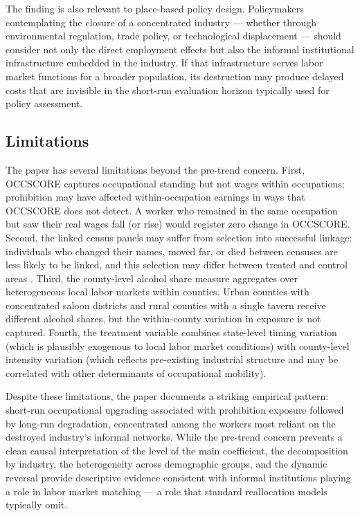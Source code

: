 \documentclass[12pt]{article}
\begin{document}
The finding is also relevant to place-based policy design. Policymakers contemplating the closure of a concentrated industry --- whether through environmental regulation, trade policy, or technological displacement --- should consider not only the direct employment effects but also the informal institutional infrastructure embedded in the industry. If that infrastructure serves labor market functions for a broader population, its destruction may produce delayed costs that are invisible in the short-run evaluation horizon typically used for policy assessment.

\subsection{Limitations}

The paper has several limitations beyond the pre-trend concern. First, OCCSCORE captures occupational standing but not wages within occupations; prohibition may have affected within-occupation earnings in ways that OCCSCORE does not detect. A worker who remained in the same occupation but saw their real wages fall (or rise) would register zero change in OCCSCORE. Second, the linked census panels may suffer from selection into successful linkage: individuals who changed their names, moved far, or died between censuses are less likely to be linked, and this selection may differ between treated and control areas \citep{abramitzky2021}. Third, the county-level alcohol share measure aggregates over heterogeneous local labor markets within counties. Urban counties with concentrated saloon districts and rural counties with a single tavern receive different alcohol shares, but the within-county variation in exposure is not captured. Fourth, the treatment variable combines state-level timing variation (which is plausibly exogenous to local labor market conditions) with county-level intensity variation (which reflects pre-existing industrial structure and may be correlated with other determinants of occupational mobility).

Despite these limitations, the paper documents a striking empirical pattern: short-run occupational upgrading associated with prohibition exposure followed by long-run degradation, concentrated among the workers most reliant on the destroyed industry's informal networks. While the pre-trend concern prevents a clean causal interpretation of the level of the main coefficient, the decomposition by industry, the heterogeneity across demographic groups, and the dynamic reversal provide descriptive evidence consistent with informal institutions playing a role in labor market matching --- a role that standard reallocation models typically omit.
\end{document}
